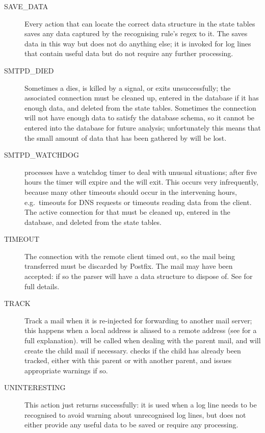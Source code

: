 \begin{description}
    \item [SAVE\_DATA] Every action that can locate the correct data
        structure in the state tables saves any data captured by the
        recognising rule's regex to it.  The  saves data
        in this way but does not do anything else; it is invoked for log
        lines that contain useful data but do not require any further
        processing.

    \item [SMTPD\_DIED] Sometimes a  dies, is killed by a
        signal, or exits unsuccessfully; the associated connection must be
        cleaned up, entered in the database if it has enough data, and
        deleted from the state tables.  Sometimes the connection will not
        have enough data to satisfy the database schema, so it cannot be
        entered into the database for future analysis; unfortunately this
        means that the small amount of data that has been gathered by
        \parsername{} will be lost.

    \item [SMTPD\_WATCHDOG]  processes have a watchdog timer
        to deal with unusual situations; after five hours the timer will
        expire and the  will exit.  This occurs very
        infrequently, because many other timeouts should occur in the
        intervening hours, e.g.\ timeouts for DNS requests or timeouts
        reading data from the client.  The active connection for that
         must be cleaned up, entered in the database, and
        deleted from the state tables.

    \item [TIMEOUT] The connection with the remote client timed out, so the
        mail being transferred must be discarded by Postfix.  The mail may
        have been accepted: if so the parser will have a data structure to
        dispose of.  See  for full
        details.

    \item [TRACK] Track a mail when it is re-injected for forwarding to
        another mail server; this happens when a local address is aliased
        to a remote address (see  for
        a full explanation).   will be called when dealing
        with the parent mail, and will create the child mail if necessary.
         checks if the child has already been tracked, either
        with this parent or with another parent, and issues appropriate
        warnings if so.

    \item [UNINTERESTING] This action just returns successfully: it is used
        when a log line needs to be recognised to avoid warning about
        unrecognised log lines, but does not either provide any useful data
        to be saved or require any processing.

\end{description}

